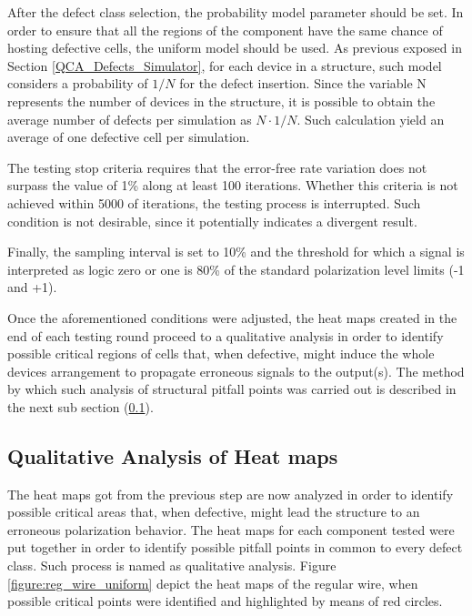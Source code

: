 After the defect class selection, the probability model parameter should be set. In order to ensure that all the regions of the component have the same chance of hosting defective cells, the uniform model should be used. As previous exposed in Section \ref{QCA_Defects_Simulator}, for each device in a structure, such model considers a probability of $1/N$ for the defect insertion. Since the variable N represents the number of devices in the structure, it is possible to obtain the average number of defects per simulation as $N \cdot 1/N$. Such calculation yield an average of one defective cell per simulation.

The testing stop criteria requires that the error-free rate variation does not surpass the value of 1\% along at least 100 iterations. Whether this criteria is not achieved within 5000 of iterations, the testing process is interrupted. Such condition is not desirable, since it potentially indicates a divergent result.

Finally, the sampling interval is set to 10\% and the threshold for which a signal is interpreted as logic zero or one is 80\% of the standard polarization level limits (-1 and +1).

Once the aforementioned conditions were adjusted, the heat maps created in the end of each testing round proceed to a qualitative analysis in order to identify possible critical regions of cells that, when defective, might induce the whole devices arrangement to propagate erroneous signals to the output(s). The method by which such analysis of structural pitfall points was carried out is described in the next sub section (\ref{Qualitative_Analysis_of_Heat_maps}).

\subsection{Qualitative Analysis of Heat maps}
\label{Qualitative_Analysis_of_Heat_maps}

The heat maps got from the previous step are now analyzed in order to identify possible critical areas that, when defective, might lead the structure to an erroneous polarization behavior. The heat maps for each component tested were put together in order to identify possible pitfall points in common to every defect class. Such process is named as qualitative analysis. Figure \ref{figure:reg_wire_uniform} depict the heat maps of the regular wire, when possible critical points were identified and highlighted by means of red circles.

